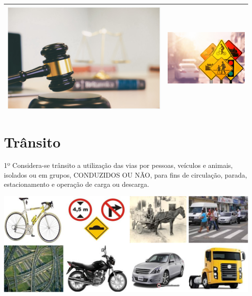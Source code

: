 \documentclass[
  letterpaper,
  DIV=11,
  numbers=noendperiod]{scrreport}
\begin{document}
\begin{longtable}[]{@{}
  >{\centering\arraybackslash}p{}
  >{\centering\arraybackslash}p{}@{}}
\toprule()
\endhead
\includegraphics{./images/image-2035638006.png} &
\includegraphics[width=3.52083in,height=\textheight]{./images/lei1-02.png} \\
\bottomrule()
\end{longtable}

\hypertarget{truxe2nsito}{%
\section{Trânsito}\label{truxe2nsito}}

1º Considera-se trânsito a utilização das vias por pessoas, veículos e
animais, isolados ou em grupos, CONDUZIDOS OU NÃO, para ﬁns de
circulação, parada, estacionamento e operação de carga ou descarga.

\includegraphics{./images/image-1961589352.png}
\end{document}

